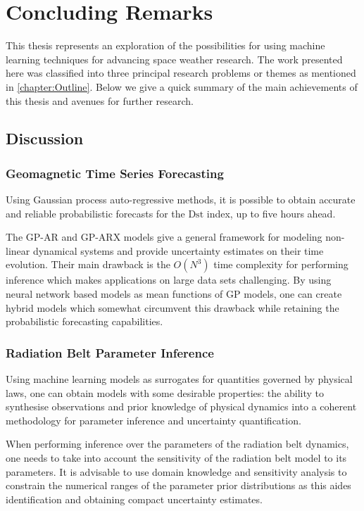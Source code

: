 \chapter{Concluding Remarks}\label{chapter:conclusions}

This thesis represents an exploration of the possibilities for using machine 
learning techniques for advancing space weather research. The work presented 
here was classified into three principal research problems or themes as 
mentioned in \cref{chapter:Outline}. Below we give a quick summary of the main 
achievements of this thesis and avenues for further research.

\section{Discussion}

\subsection*{Geomagnetic Time Series Forecasting}

Using Gaussian process auto-regressive methods, it is possible to obtain 
accurate and reliable probabilistic forecasts for the $\mathrm{Dst}$ index, 
up to five hours ahead. 

The GP-AR and GP-ARX models give a general framework for modeling non-linear 
dynamical systems and provide uncertainty estimates on their time evolution. 
Their main drawback is the $O(N^3)$ time complexity for performing inference 
which makes applications on large data sets challenging. By using neural 
network based models as mean functions of GP models, one can create hybrid 
models which somewhat circumvent this drawback while retaining the 
probabilistic forecasting capabilities.

\subsection*{Radiation Belt Parameter Inference}

Using machine learning models as surrogates for quantities governed by physical 
laws, one can obtain models with some desirable properties: the ability to 
synthesise observations and prior knowledge of physical dynamics into a 
coherent methodology for parameter inference and uncertainty quantification. 

When performing inference over the parameters of the radiation belt dynamics, 
one needs to take into account the sensitivity of the radiation belt model to 
its parameters. It is advisable to use domain knowledge and sensitivity 
analysis to constrain the numerical ranges of the parameter prior distributions 
as this aides identification and obtaining compact uncertainty estimates.

